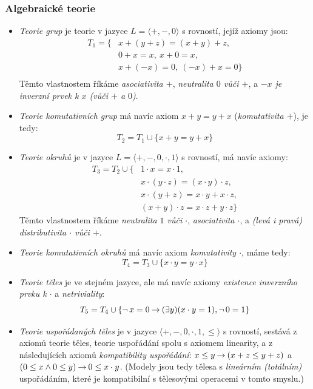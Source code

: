 \subsubsection{Algebraické teorie}

\begin{itemize}
    \item \emph{Teorie grup} je teorie v jazyce $L=\langle +,-,0\rangle$ s rovností, jejíž axiomy jsou:
    \begin{align*}
        T_1=\{& x + (y + z) = (x + y) + z,\\
            & 0 + x = x,\ x + 0 = x,\\
            & x + (-x) = 0,\ (-x) + x = 0\}\\
    \end{align*}
    Těmto vlastnostem říkáme \emph{asociativita $+$}, \emph{neutralita $0$ vůči $+$}, a \emph{$-x$ je inverzní prvek k $x$ (vůči $+$ a $0$)}.
    \item \emph{Teorie komutativních grup} má navíc axiom $x+y=y+x$ (\emph{komutativita $+$}), je tedy: 
    $$
    T_2=T_1\cup\{x+y=y+x\}
    $$
    \item \emph{Teorie okruhů} je v jazyce $L=\langle +,-,0,\cdot,1\rangle$ s rovností, má navíc axiomy:
    \begin{align*}
        T_3=T_2\cup\{   & 1 \cdot x = x \cdot 1,\\
        & x \cdot (y \cdot z) = (x \cdot y) \cdot z,\\
        & x \cdot (y + z) = x \cdot y + x \cdot z,\\
        & (x + y) \cdot z = x \cdot z + y \cdot z\}
    \end{align*}
    Těmto vlastnostem říkáme \emph{neutralita $1$ vůči $\cdot$}, \emph{asociativita $\cdot$}, a \emph{(levá i pravá) distributivita $\cdot$ vůči $+$}.
    \item \emph{Teorie komutativních okruhů} má navíc axiom \emph{komutativity $\cdot$}, máme tedy:
    $$
    T_4 = T_3 \cup \{x \cdot y = y \cdot x\}
    $$
    \item \emph{Teorie těles} je ve stejném jazyce, ale má navíc axiomy \emph{existence inverzního prvku k $\cdot$} a \emph{netriviality}:
    $$
    T_5 = T_4 \cup \{\neg\,x=0 \mathbin{\rightarrow} (\exists y)(x\cdot y = 1), \neg\,0=1\}
    $$
    \item \emph{Teorie uspořádaných těles} je v jazyce $\langle +, -, 0,\cdot,1,\leq\rangle$ s rovností, sestává z axiomů teorie těles, teorie uspořádání spolu s axiomem linearity, a z následujících axiomů \emph{kompatibility uspořádání}: $x\leq y\mathbin{\rightarrow} (x+z\leq y+z)$ a $(0\leq x\land 0\leq y)\mathbin{\rightarrow} 0\leq x\cdot y$. (Modely jsou tedy tělesa s \emph{lineárním (totálním)} uspořádáním, které je kompatibilní s tělesovými operacemi v tomto smyslu.)
\end{itemize}


